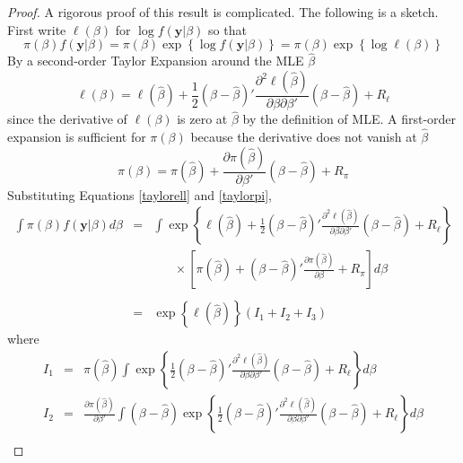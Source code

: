 \begin{proof}
A rigorous proof of this result is complicated. The following is a sketch. First write $\ell(\beta)$ for $\log{f(\mathbf{y}|\beta)}$ so that 
$$\pi(\beta)f(\mathbf{y}|\beta) = \pi(\beta) \exp{\left\{ \log{f(\mathbf{y}| \beta)} \right\}}=\pi(\beta) \exp{\left\{ \log{\ell(\beta)} \right\}}$$
By a second-order Taylor Expansion around the MLE $\hat{\beta}$
	\begin{equation}
	\label{taylorell}
		\ell(\beta) = \ell(\hat{\beta}) +\frac{1}{2} \left( \beta - \hat{\beta}  \right)' \frac{\partial^2 \ell(\hat{\beta})}{\partial \beta \partial \beta'} \left( \beta - \hat{\beta}  \right) + R_\ell
	\end{equation}
since the derivative of $\ell(\beta)$ is zero at $\hat{\beta}$ by the definition of MLE. A first-order expansion is sufficient for $\pi(\beta)$ because the derivative does not vanish at $\hat{\beta}$
	\begin{equation}
		\label{taylorpi}
		\pi(\beta) = \pi(\hat{\beta}) +  \frac{\partial \pi(\hat{\beta})}{\partial \beta'} \left(\beta - \hat{\beta}  \right)+ R_\pi
	\end{equation}
Substituting Equations \ref{taylorell} and \ref{taylorpi},
	\begin{eqnarray*}
		\int \pi(\beta)f(\mathbf{y}|\beta)d\beta &=& \int \exp\left\{ \ell(\hat{\beta}) +\frac{1}{2} \left( \beta - \hat{\beta}  \right)' \frac{\partial^2 \ell(\hat{\beta})}{\partial \beta \partial \beta'} \left( \beta - \hat{\beta}  \right) + R_\ell \right\}\\
		&&\;\;\;\;\;\;\times \left[ \pi(\hat{\beta}) + \left(\beta - \hat{\beta}  \right)' \frac{\partial \pi(\hat{\beta})}{\partial \beta} + R_\pi \right]  d\beta\\\\
		&=& \exp\left\{ \ell(\hat{\beta}) \right\} (I_1 + I_2 + I_3)
	\end{eqnarray*}
where
	\begin{eqnarray*}
		I_1 &=& \pi(\hat{\beta}) \int  \exp{\left\{ \frac{1}{2} \left( \beta - \hat{\beta}  \right)' \frac{\partial^2 \ell(\hat{\beta})}{\partial \beta \partial \beta'} \left( \beta - \hat{\beta}  \right) + R_\ell\right\}} d\beta\\
		I_2 &=& \frac{\partial \pi(\hat{\beta})}{\partial \beta'}   \int  \left(\beta - \hat{\beta}  \right) \exp{\left\{ \frac{1}{2} \left( \beta - \hat{\beta}  \right)' \frac{\partial^2 \ell(\hat{\beta})}{\partial \beta \partial \beta'} \left( \beta - \hat{\beta}  \right) + R_\ell\right\}} d\beta\\

\end{eqnarray*}
\end{proof}
